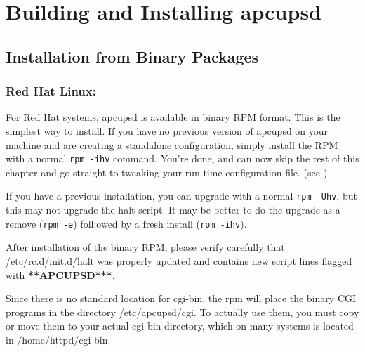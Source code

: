 \label{Building-and-Installing-apcupsd}

\section*{Building and Installing apcupsd}

\label{index-Building-18}
\label{index-Installing-19}

\label{Installation-from-Binary-Packages}

\subsection*{Installation from Binary Packages}

\label{Red-Hat-Linux}

\subsubsection*{Red Hat Linux:}

\label{index-Installing_002c-Red-Hat-20}
For Red Hat systems, apcupsd is available in binary RPM format.  This is the
simplest way to install. If you have no previous version of apcupsd on your
machine and are creating a standalone configuration, simply install the RPM
with a normal {\tt rpm -ihv} command. You're done, and can now skip the rest
of this chapter and go straight to tweaking your run-time configuration file.
(see 
)  

If you have a previous installation, you can upgrade with a normal {\tt rpm
-Uhv}, but this may not upgrade the halt script. It may be better to do the
upgrade as a remove ({\tt rpm -e}) foll;owed by a fresh install ({\tt rpm
-ihv}).  

After installation of the binary RPM, please verify carefully that
/etc/rc.d/init.d/halt was properly updated and contains new script lines
flagged with {\bf ***APCUPSD***}.  

Since there is no standard location for cgi-bin, the rpm will place the binary
CGI programs in the directory /etc/apcupsd/cgi. To actually use them, you must
copy or move them to your actual cgi-bin directory, which on many systems is
located in /home/httpd/cgi-bin. 

